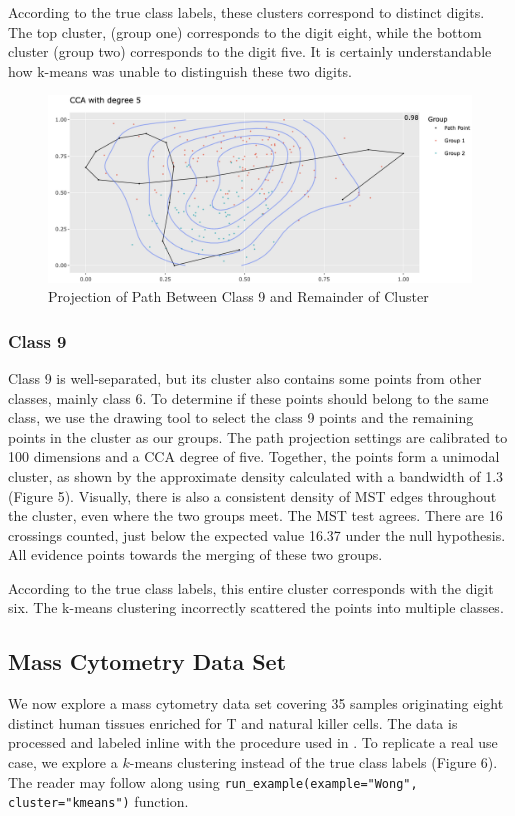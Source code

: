 \documentclass{article}
\begin{document}
According to the true class labels, these clusters correspond to distinct digits. The top cluster, (group one) corresponds to the digit eight, while the bottom cluster (group two) corresponds to the digit five. It is certainly understandable how k-means was unable to distinguish these two digits.

\renewcommand{\figurename}{Figure}
\renewcommand{\thefigure}{5}
\begin{figure}[!t]
\centering
\includegraphics[scale=0.37]{class 9 projection MNIST}
\caption{Projection of Path Between Class 9 and Remainder of Cluster}
\end{figure}

\subsubsection{Class 9}
Class 9 is well-separated, but its cluster also contains some points from other classes, mainly class 6. To determine if these points should belong to the same class, we use the drawing tool to select the class 9 points and the remaining points in the cluster as our groups. The path projection settings are calibrated to 100 dimensions and a CCA degree of five. Together, the points form a unimodal cluster, as shown by the approximate density calculated with a bandwidth of 1.3 (Figure 5). Visually, there is also a consistent density of MST edges throughout the cluster, even where the two groups meet. The MST test agrees. There are 16 crossings counted, just below the expected value 16.37 under the null hypothesis. All evidence points towards the merging of these two groups.

According to the true class labels, this entire cluster corresponds with the digit six. The k-means clustering incorrectly scattered the points into multiple classes.

\subsection{Mass Cytometry Data Set}
We now explore a mass cytometry data set \cite{Wong data set} covering 35 samples originating eight distinct human tissues enriched for T and natural killer cells. The data is processed and labeled inline with the procedure used in \cite{UMAP example}. To replicate a real use case, we explore a $k$-means clustering instead of the true class labels (Figure 6). The reader may follow along using \texttt{run\_example(example="Wong", cluster="kmeans")} function.
\end{document}
